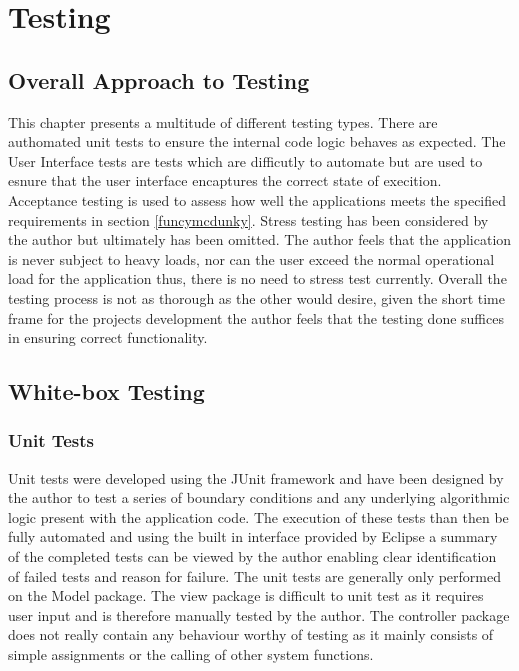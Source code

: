 \chapter{Testing}

\section{Overall Approach to Testing}

This chapter presents a multitude of different testing types. There are authomated unit tests to ensure the internal code logic behaves as expected. The User Interface tests are tests which are difficutly to automate but are used to esnure that the user interface encaptures the correct state of execition. Acceptance testing is used to assess how well the applications meets the specified requirements in section \ref{funcymcdunky}. Stress testing has been considered by the author but ultimately has been omitted. The author feels that the application is never subject to heavy loads, nor can the user exceed the normal operational load for the application thus, there is no need to stress test currently. Overall the testing process is not as thorough as the other would desire, given the short time frame for the projects development the author feels that the testing done suffices in ensuring correct functionality.
\section{White-box Testing}
\subsection{Unit Tests}

Unit tests were developed using the JUnit framework and have been designed by the author to test a series of boundary conditions and any underlying algorithmic logic present with the application code. The execution of these tests than then be fully automated and using the built in interface provided by Eclipse a summary of the completed tests can be viewed by the author enabling clear identification of failed tests and reason for failure. The unit tests are generally only performed on the Model package. The view package is difficult to unit test as it requires user input and is therefore manually tested by the author. The controller package does not really contain any behaviour worthy of testing as it mainly consists of simple assignments or the calling of other system functions.

